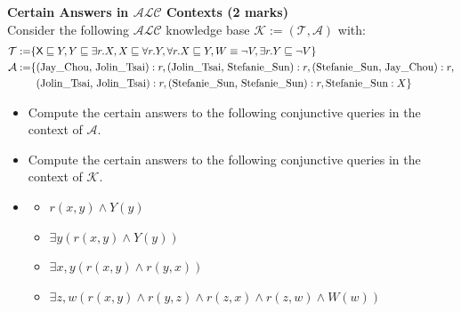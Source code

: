 \documentclass[12pt,a4paper]{article}
\newenvironment{problem}[2][{\color{red}Question}]{\begin{trivlist}
\item[\hskip \labelsep {\bfseries #1}\hskip \labelsep {\bfseries #2.}]}{\end{trivlist}}
\begin{document}
\begin{problem}{{\color{red}4}}
\textbf{Certain Answers in $\mathcal{ALC}$ Contexts (2 marks)}\\
Consider the following $\mathcal{ALC}$ knowledge base $\mathcal{K}:=(\mathcal{T},\mathcal{A})$ with:
\begin{align*}
    \mathcal{T} := & \{\textsf{$\textsf{X}\sqsubseteq Y, Y\sqsubseteq\exists r.X, X\sqsubseteq\forall r.Y, \forall r.X\sqsubseteq Y, W\equiv\neg V, \exists r.Y\sqsubseteq\neg V$}\}\\
    \mathcal{A} := & \{\text{(Jay\_Chou, Jolin\_Tsai)} : r, \text{(Jolin\_Tsai, Stefanie\_Sun)} : r, \text{(Stefanie\_Sun, Jay\_Chou)} : r,\\
    & \text{\textcolor{white}{\{}(Jolin\_Tsai, Jolin\_Tsai)} : r, \text{(Stefanie\_Sun, Stefanie\_Sun)} : r, \text{Stefanie\_Sun} : X\}
\end{align*}
\begin{itemize}
    \item[-] Compute the certain answers to the following conjunctive queries in the context of $\mathcal{A}$.
    \item[-] Compute the certain answers to the following conjunctive queries in the context of $\mathcal{K}$.
    \item[]\begin{itemize}
        \item[1.] $r(x, y)\wedge Y(y)$
        \item[2.] $\exists y(r(x, y)\wedge Y(y))$
        \item[3.] $\exists x,y(r(x, y)\wedge r(y, x))$
        \item[4.] $\exists z,w(r(x, y)\wedge r(y, z)\wedge r(z, x)\wedge r(z, w)\wedge W(w))$
    \end{itemize}
\end{itemize}

\end{problem}
\end{document}
